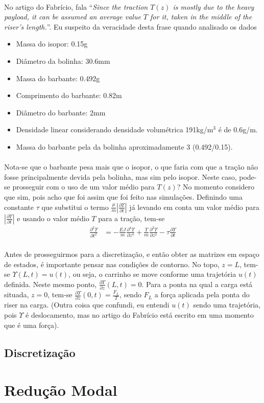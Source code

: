 \documentclass[a4paper,11pt]{scrartcl} %
\numberwithin{equation}{section} %
\numberwithin{figure}{section} %
\numberwithin{table}{section} %
\begin{document}
\paragraph{} No artigo do Fabrício, fala ``\textit{Since the traction $T (z)$ is mostly due to the heavy payload,
it can be assumed an average value $T$ for it, taken in the
            middle of the riser’s length.}''. Eu suspeito da veracidade desta frase quando analisado os dados \begin{itemize}
            	\item Massa do isopor: 0.15g
	\item Diâmetro da bolinha: 30.6mm
	\item Massa do barbante: 0.492g
	\item Comprimento do barbante: 0.82m
	\item Diâmetro do barbante: 2mm
	\item Densidade linear considerando densidade volumétrica 191kg/m$^3$ é de 0.6g/m.
\item Massa do barbante pela da bolinha aproximadamente 3 (0.492/0.15).
            \end{itemize}
            
\paragraph{} Nota-se que o barbante pesa mais que o isopor, o que faria com que a tração não fosse principalmente devida pela bolinha, mas sim pelo isopor. Neste caso, pode-se prosseguir com o uso de um valor médio para $T(z)$? No momento considero que sim, pois acho que foi assim que foi feito nas simulações. Definindo uma constante $\tau$ que substitui o termo $\frac{\mu}{m}\left|\frac{\partial \Upsilon}{\partial t}\right|$ já levando em conta um valor médio para $\left|\frac{\partial \Upsilon}{\partial t}\right|$ e usando o valor médio $T$ para a tração, tem-se \begin{align}
	\frac{\partial^2 \Upsilon}{\partial t^2} &= -\frac{EJ}{m}\frac{\partial^4 \Upsilon}{\partial z^4} + \frac{T}{m}\frac{\partial^2 \Upsilon}{\partial z^2} - \tau\frac{\partial \Upsilon}{\partial t}
	\end{align}
	
\paragraph{} Antes de prosseguirmos para a discretização, e então obter as matrizes em espaço de estados, é importante pensar nas condições de contorno. No topo, $z=L$, tem-se $\Upsilon(L,t)=u(t)$, ou seja, o carrinho se move conforme uma trajetória $u(t)$ definida. Neste mesmo ponto, $\frac{\partial\Upsilon}{\partial z}(L,t) = 0$. Para a ponta na qual a carga está situada, $z=0$, tem-se $\frac{\partial\Upsilon}{\partial z}(0,t) = \frac{F_L}{T}$, sendo $F_L$ a força aplicada pela ponta do riser na carga. (Outra coisa que confundi, eu entendi $u(t)$ sendo uma trajetória, pois $\Upsilon$ é deslocamento, mas no artigo do Fabrício está escrito em uma momento que é uma força).

\subsection{Discretização}

\section{Redução Modal}
\end{document}
